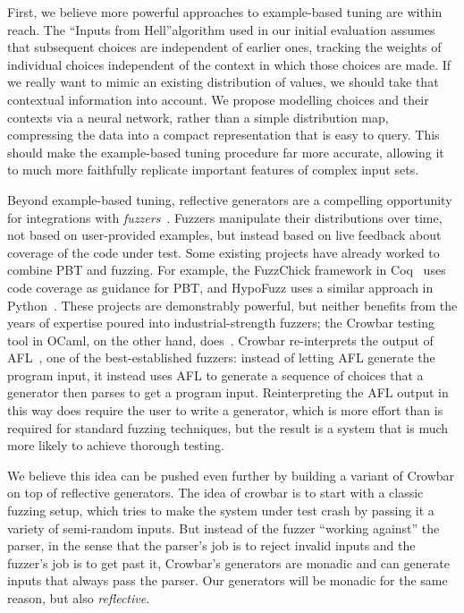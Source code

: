First, we believe more powerful approaches to example-based tuning are
within reach.  The
``Inputs from Hell''\iflater{}\fi algorithm used in
our initial evaluation assumes
that subsequent choices are
independent of earlier ones, tracking the weights of individual
choices independent of the
context in which those choices are made. If we really want to mimic an existing
distribution of values, we should take that contextual information into
account. We propose modelling choices and their contexts via a neural network,
rather than a simple distribution map, compressing the data into a compact
representation that is easy to query.
This should make the example-based tuning
procedure far more accurate, allowing it to much more faithfully replicate
important features of complex input sets.

Beyond example-based tuning, reflective generators are a compelling opportunity
for integrations with
{\em fuzzers}~\cn {}. Fuzzers manipulate their distributions over time, not based on
user-provided examples, but instead based on live feedback about coverage of the
code under test.
Some existing projects have already worked to
combine PBT and fuzzing.
For example, the FuzzChick framework in Coq~\cite{DBLP:journals/pacmpl/Lampropoulos0P19}
uses code coverage as guidance for PBT, and HypoFuzz uses a
similar approach in Python~\cite{hatfield-dodds_hypofuzz_nodate}. These projects
are demonstrably powerful, but neither benefits from the years of expertise
poured into industrial-strength fuzzers; the Crowbar testing tool in
OCaml, on the other hand,
does~\cite{dolan2017testing}. Crowbar re-interprets the output of
AFL~\cite{afl-readme}, one of the best-established
fuzzers: instead of letting AFL generate the program input, it instead uses AFL
to generate a sequence of choices that a generator then parses to get a program input.
Reinterpreting the AFL output in this way
does require the user to write a generator, which is more effort
than is required for
standard fuzzing techniques, but the result is a system that is much more likely
to achieve thorough testing.

We believe this idea can be pushed even further by building
a variant of Crowbar on top of reflective generators.
The idea of crowbar is to start with a classic fuzzing setup, which tries to make the
system under test
crash by passing it a variety of semi-random inputs. But instead of
the fuzzer
``working against'' the parser, in the sense that the parser's job is to reject
invalid inputs and the fuzzer's job is to get past it, Crowbar's generators are
monadic and can generate
inputs that always pass the parser. Our generators will be monadic for the same
reason, but also {\em reflective}.

